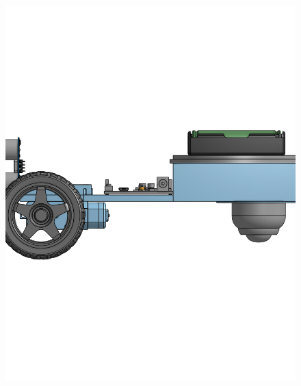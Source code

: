 \documentclass[a4paper,12pt]{article}
\begin{document}
\begin{center}\begin{figure}[H]\centering\includegraphics[height=0.45\textheight]{./model_images/a4.png}\end{figure}\FloatBarrier\end{center}
\end{document}
